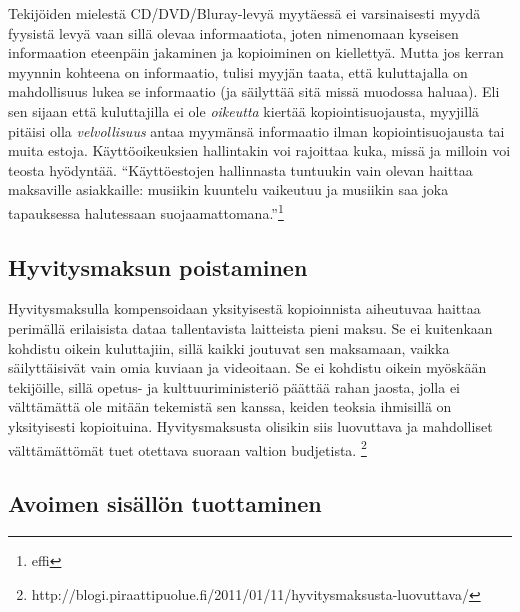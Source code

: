\documentclass[titlepage,12pt]{article}
\begin{document}
Tekijöiden mielestä CD/DVD/Bluray-levyä myytäessä ei varsinaisesti
myydä fyysistä levyä vaan sillä olevaa informaatiota, joten nimenomaan
kyseisen informaation eteenpäin jakaminen ja kopioiminen on
kiellettyä.  Mutta jos kerran myynnin kohteena on informaatio, tulisi
myyjän taata, että kuluttajalla on mahdollisuus lukea se informaatio
(ja säilyttää sitä missä muodossa haluaa).  Eli sen sijaan että
kuluttajilla ei ole \emph{oikeutta} kiertää kopiointisuojausta,
myyjillä pitäisi olla \emph{velvollisuus} antaa myymänsä informaatio
ilman kopiointisuojausta tai muita estoja.
%
%
%
%
Käyttöoikeuksien hallintakin voi rajoittaa kuka, missä ja milloin voi
teosta hyödyntää.  ``Käyttöestojen hallinnasta tuntuukin vain olevan
haittaa maksaville asiakkaille: musiikin kuuntelu vaikeutuu ja
musiikin saa joka tapauksessa halutessaan
suojaamattomana.''\footnote{effi}




\subsection{Hyvitysmaksun poistaminen}

Hyvitysmaksulla kompensoidaan yksityisestä kopioinnista aiheutuvaa
haittaa perimällä erilaisista dataa tallentavista laitteista pieni
maksu.  Se ei kuitenkaan kohdistu oikein kuluttajiin, sillä kaikki
joutuvat sen maksamaan, vaikka säilyttäisivät vain omia kuviaan ja
videoitaan.  Se ei kohdistu oikein myöskään tekijöille, sillä opetus-
ja kulttuuriministeriö päättää rahan jaosta, jolla ei välttämättä ole
mitään tekemistä sen kanssa, keiden teoksia ihmisillä on yksityisesti
kopioituina.  Hyvitysmaksusta olisikin siis luovuttava ja mahdolliset
välttämättömät tuet otettava suoraan valtion budjetista.
\footnote{http://blogi.piraattipuolue.fi/2011/01/11/hyvitysmaksusta-luovuttava/}


\subsection{Avoimen sisällön tuottaminen}
\end{document}
